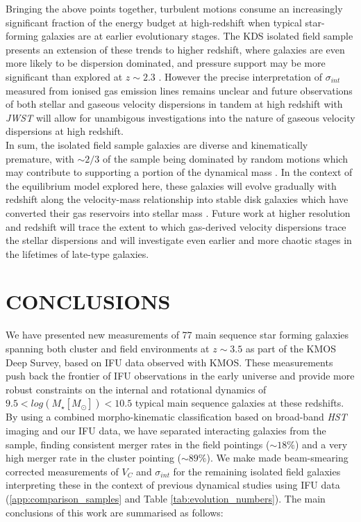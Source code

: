 \documentclass[fleqn,usenatbib]{mn2e}
\begin{document}
Bringing the above points together, turbulent motions consume an increasingly significant fraction of the energy budget at high-redshift when typical star-forming galaxies are at earlier evolutionary stages.
The KDS isolated field sample presents an extension of these trends to higher redshift, where galaxies are even more likely to be dispersion dominated, and pressure support may be more significant than explored at $z\sim2.3$ \citep{Wuyts2016b,Ubler2017,Genzel2017,Lang2017}.    
However the precise interpretation of $\sigma_{int}$ measured from ionised gas emission lines remains unclear and future observations of both stellar and gaseous velocity dispersions in tandem at high redshift with {\it JWST} will allow for unambigous investigations into the nature of gaseous velocity dispersions at high redshift. \\

In sum, the isolated field sample galaxies are diverse and kinematically premature, with $\sim2/3$ of the sample being dominated by random motions which may contribute to supporting a portion of the dynamical mass \citep[e.g.][]{Kassin2007,Burkert2010,Kassin2012,Newman2013,Straatman2017,Ubler2017,Lang2017}.
In the context of the equilibrium model explored here, these galaxies will evolve gradually with redshift along the velocity-mass relationship into stable disk galaxies which have converted their gas reservoirs into stellar mass \citep[e.g.][]{Lilly2013,Tacconi2013,Wisnioski2015,Tacconi2017}. 
Future work at higher resolution and redshift will trace the extent to which gas-derived velocity dispersions trace the stellar dispersions and will investigate even earlier and more chaotic stages in the lifetimes of late-type galaxies.

\section{CONCLUSIONS}\label{sec:conclusion}
We have presented new measurements of 77 main sequence star forming galaxies spanning both cluster and field environments at $z\sim3.5$ as part of the KMOS Deep Survey, based on IFU data observed with KMOS.
These measurements push back the frontier of IFU observations in the early universe and provide more robust constraints on the internal and rotational dynamics of $9.5 < log(M_{\star}[M_{\odot}])< 10.5$ typical main sequence galaxies at these redshifts.
By using a combined morpho-kinematic classification based on broad-band {\em HST} imaging and our IFU data, we have separated interacting galaxies from the sample, finding consistent merger rates in the field pointings ($\sim18\%$) and a very high merger rate in the cluster pointing ($\sim89\%$).
We make made beam-smearing corrected measurements of $V_{C}$ and $\sigma_{int}$ for the remaining isolated field galaxies interpreting these in the context of previous dynamical studies using IFU data (\cref{app:comparison_samples} and Table \ref{tab:evolution_numbers}).
The main conclusions of this work are summarised as follows:
\end{document}
